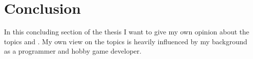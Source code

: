 \chapter{Conclusion}

In this concluding section of the thesis I want to give my own opinion about the
topics \mss{} and \ogs{}. My own view on the topics is heavily influenced by my
background as a programmer and hobby game developer.









